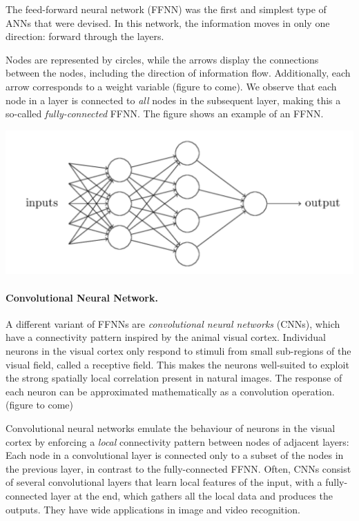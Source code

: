 \documentclass[%
oneside,                 %
final,                   %
10pt]{article}
\begin{document}
The feed-forward neural network (FFNN) was the first and simplest type
of ANNs that were devised. In this network, the information moves in
only one direction: forward through the layers.

Nodes are represented by circles, while the arrows display the
connections between the nodes, including the direction of information
flow. Additionally, each arrow corresponds to a weight variable
(figure to come).  We observe that each node in a layer is connected
to \emph{all} nodes in the subsequent layer, making this a so-called
\emph{fully-connected} FFNN.  The figure shows an example of an FFNN.



\vspace{6mm}

\centerline{\includegraphics[width=0.6\linewidth]{figures/dnn.png}}

\vspace{6mm}



\paragraph{Convolutional Neural Network.}
A different variant of FFNNs are \emph{convolutional neural networks}
(CNNs), which have a connectivity pattern inspired by the animal
visual cortex. Individual neurons in the visual cortex only respond to
stimuli from small sub-regions of the visual field, called a receptive
field. This makes the neurons well-suited to exploit the strong
spatially local correlation present in natural images. The response of
each neuron can be approximated mathematically as a convolution
operation.  (figure to come)

Convolutional neural networks emulate the behaviour of neurons in the
visual cortex by enforcing a \emph{local} connectivity pattern between
nodes of adjacent layers: Each node in a convolutional layer is
connected only to a subset of the nodes in the previous layer, in
contrast to the fully-connected FFNN.  Often, CNNs consist of several
convolutional layers that learn local features of the input, with a
fully-connected layer at the end, which gathers all the local data and
produces the outputs. They have wide applications in image and video
recognition.
\end{document}
